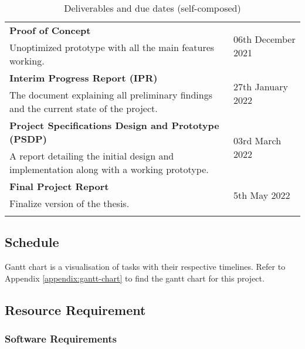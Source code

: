 \begin{longtable}{|p{115mm}|p{35mm}|}
    \textbf{Proof of Concept} & 
    \multirow{2}{*}{06th December 2021} \\
    Unoptimized prototype with all the main features working. & 
     \\ \hline

    \textbf{Interim Progress Report (IPR)} & 
    \multirow{2}{*}{27th January 2022} \\
    The document explaining all preliminary findings and the current state of the project. & 
     \\ \hline

    \textbf{Project Specifications Design and Prototype (PSDP)} & 
    \multirow{2}{*}{03rd March 2022} \\ 
    A report detailing the initial design and implementation along with a working prototype. & 
     \\ \hline



    \textbf{Final Project Report} & 
    \multirow{2}{*}{5th May 2022} \\
    Finalize version of the thesis. & 
     \\ \hline

\caption{Deliverables and due dates (self-composed)}
\end{longtable}

\subsection{Schedule}
Gantt chart is a visualisation of tasks with their respective timelines. Refer to Appendix \ref{appendix:gantt-chart} to find the gantt chart for this project.



\subsection{Resource Requirement}

\subsubsection{Software Requirements}


